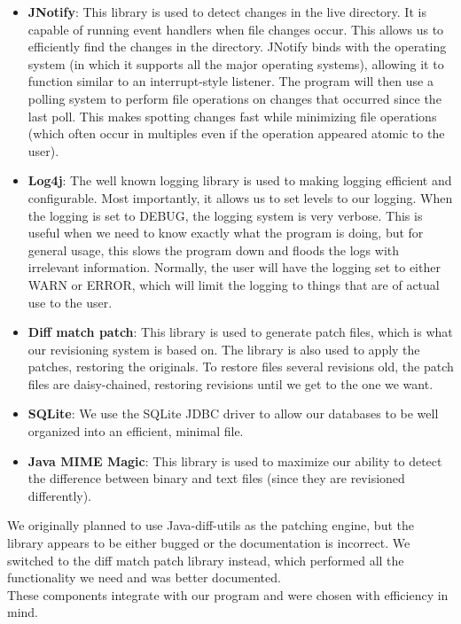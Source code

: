 \documentclass[12pt,a4paper]{article}
\begin{document}
\begin{itemize}
\item \textbf{JNotify}: This library is used to detect changes in the live directory. It is capable of running event handlers when file changes occur. This allows us to efficiently find the changes in the directory. JNotify binds with the operating system (in which it supports all the major operating systems), allowing it to function similar to an interrupt-style listener. The program will then use a polling system to perform file operations on changes that occurred since the last poll. This makes spotting changes fast while minimizing file operations (which often occur in multiples even if the operation appeared atomic to the user).
\item \textbf{Log4j}: The well known logging library is used to making logging efficient and configurable. Most importantly, it allows us to set levels to our logging. When the logging is set to DEBUG, the logging system is very verbose. This is useful when we need to know exactly what the program is doing, but for general usage, this slows the program down and floods the logs with irrelevant information. Normally, the user will have the logging set to either WARN or ERROR, which will limit the logging to things that are of actual use to the user.
\item \textbf{Diff match patch}: This library is used to generate patch files, which is what our revisioning system is based on. The library is also used to apply the patches, restoring the originals. To restore files several revisions old, the patch files are daisy-chained, restoring revisions until we get to the one we want.
\item \textbf{SQLite}: We use the SQLite JDBC driver to allow our databases to be well organized into an efficient, minimal file.
\item \textbf{Java MIME Magic}: This library is used to maximize our ability to detect the difference between binary and text files (since they are revisioned differently).
\end{itemize}

We originally planned to use Java-diff-utils as the patching engine, but the library appears to be either bugged or the documentation is incorrect. We switched to the diff match patch library instead, which performed all the functionality we need and was better documented. \\

These components integrate with our program and were chosen with efficiency in mind.
\end{document}
